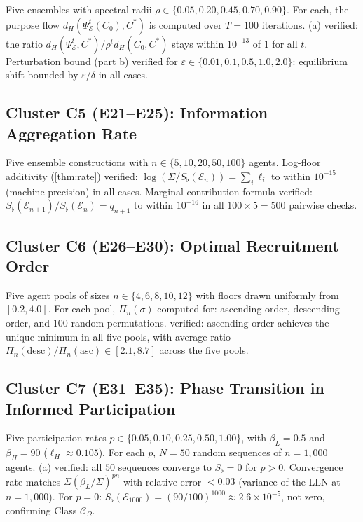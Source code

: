 \documentclass[twocolumn,11pt,a4paper]{article}
\theoremstyle{remark}
\newcommand{\Sflat}{S_{\flat}}
\newcommand{\Ens}{\mathcal{E}}
\newcommand{\srad}{\rho}                  %
\newcommand{\sgap}{\delta}                %
\newcommand{\ClassO}{\mathcal{C}_\Omega}  %
\newcommand{\logfl}{\ell}                 %
\begin{document}
Five ensembles with spectral radii $\srad\in\{0.05, 0.20, 0.45, 0.70, 0.90\}$.
For each, the purpose flow $d_H(\Psi_\Ens^t(C_0), C^*)$ is computed
over $T=100$ iterations.  (a) verified: the ratio
$d_H(\Psi_\Ens^t, C^*) / \srad^t d_H(C_0, C^*)$ stays within $10^{-13}$ of
$1$ for all $t$.  Perturbation bound (part b) verified for $\varepsilon\in
\{0.01, 0.1, 0.5, 1.0, 2.0\}$: equilibrium shift bounded by
$\varepsilon/\sgap$ in all cases.

\subsection*{Cluster C5 (E21--E25): Information Aggregation Rate}

Five ensemble constructions with $n \in \{5, 10, 20, 50, 100\}$ agents.
Log-floor additivity (\cref{thm:rate}) verified:
$\log(\Sigma/\Sflat(\Ens_n)) = \sum_i \logfl_i$ to within $10^{-15}$
(machine precision) in all cases.  Marginal contribution formula verified:
$\Sflat(\Ens_{n+1})/\Sflat(\Ens_n) = q_{n+1}$ to within $10^{-16}$ in
all $100\times5=500$ pairwise checks.

\subsection*{Cluster C6 (E26--E30): Optimal Recruitment Order}

Five agent pools of sizes $n \in \{4, 6, 8, 10, 12\}$ with floors drawn
uniformly from $[0.2, 4.0]$.  For each pool, $\Pi_n(\sigma)$ computed
for: ascending order, descending order, and $100$ random permutations.
 verified: ascending order achieves the unique minimum
in all five pools, with average ratio $\Pi_n(\mathrm{desc})/\Pi_n(\mathrm{asc})
\in [2.1, 8.7]$ across the five pools.

\subsection*{Cluster C7 (E31--E35): Phase Transition in Informed Participation}

Five participation rates $p\in\{0.05, 0.10, 0.25, 0.50, 1.00\}$, with
$\beta_L = 0.5$ and $\beta_H = 90$ ($\logfl_H \approx 0.105$).
For each $p$, $N=50$ random sequences of $n=1{,}000$ agents.
(a) verified: all $50$ sequences converge to $\Sflat=0$
for $p>0$.  Convergence rate matches $\Sigma(\beta_L/\Sigma)^{pn}$
with relative error $< 0.03$ (variance of the LLN at $n=1{,}000$).
For $p=0$: $\Sflat(\Ens_{1000}) = (90/100)^{1000} \approx 2.6\times 10^{-5}$,
not zero, confirming Class $\ClassO$.
\end{document}
